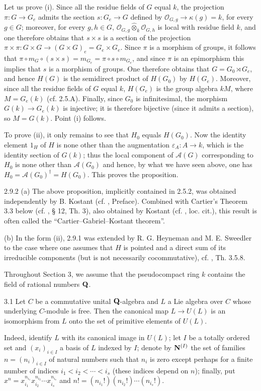 Let us prove (i). Since all the residue fields of $G$ equal $k$, the projection $\pi:G\to G_e$ admits the section $s:G_e\to G$ defined by $\mathcal O_{G,g}\to\kappa(g)=k$, for every $g\in G$; moreover, for every $g,h\in G$, $\mathcal O_{G,g}\widehat\otimes_k\mathcal O_{G,h}$ is local with residue field $k$, and one therefore obtains that $s\times s$ is a section of the projection $\pi\times\pi:G\times G\to(G\times G)_e=G_e\times G_e$. Since $\pi$ is a morphism of groups, it follows that $\pi\circ m_G\circ(s\times s)=m_{G_e}=\pi\circ s\circ m_{G_e}$, and since $\pi$ is an epimorphism this implies that $s$ is a morphism of groups. One therefore obtains that $G=G_0\rtimes G_e$, and hence $H(G)$ is the semidirect product of $H(G_0)$ by $H(G_e)$. Moreover, since all the residue fields of $G$ equal $k$, $H(G_e)$ is the group algebra $kM$, where $M=G_e(k)$ (cf. 2.5.A). Finally, since $G_0$ is infinitesimal, the morphism $G(k)\to G_e(k)$ is injective; it is therefore bijective (since it admits a section), so $M=G(k)$. Point (i) follows.

To prove (ii), it only remains to see that $H_0$ equals $H(G_0)$. Now the identity element $1_H$ of $H$ is none other than the augmentation $\varepsilon_A:A\to k$, which is the identity section of $G(k)$; thus the local component of $\mathscr A(G)$ corresponding to $H_0$ is none other than $\mathscr A(G_0)$ and hence, by what we have seen above, one has $H_0=\mathscr A(G_0)^\dagger=H(G_0)$. This proves the proposition.
\begin{remarks}{2.9.2}\label{VIIB.2.9.2}
(a) The above proposition, implicitly contained in 2.5.2, was obtained independently by B. Kostant (cf. \cite{Sw69}, Preface). Combined with Cartier's Theorem 3.3 below (cf. \cite{Ca62}, § 12, Th. 3), also obtained by Kostant (cf. \cite{Sw69}, loc. cit.), this result is often called the ``Cartier--Gabriel--Kostant theorem''.

(b) In the form (ii), 2.9.1 was extended by R. G. Heyneman and M. E. Sweedler to the case where one assumes that $H$ is pointed and a direct sum of its irreducible components (but is not necessarily cocommutative), cf. \cite{HS69}, Th. 3.5.8.
\end{remarks}

Throughout Section 3, we assume that the pseudocompact ring $k$ contains the field of rational numbers $\mathbf{Q}$.
\begin{lemma}{3.1}\label{VIIB.3.1}
Let $C$ be a commutative unital $\mathbf{Q}$-algebra and $L$ a Lie algebra over $C$ whose underlying $C$-module is free. Then the canonical map $L\to U(L)$ is an isomorphism from $L$ onto the set of primitive elements of $U(L)$.
\end{lemma}
Indeed, identify $L$ with its canonical image in $U(L)$; let $I$ be a totally ordered set and $(x_i)_{i\in I}$ a basis of $L$ indexed by $I$; denote by $\mathbf{N}^{(I)}$ the set of families $n=(n_i)_{i\in I}$ of natural numbers such that $n_i$ is zero except perhaps for a finite number of indices $i_1<i_2<\cdots<i_s$ (these indices depend on $n$); finally, put $x^n=x_{i_1}^{n_{i_1}}x_{i_2}^{n_{i_2}}\cdots x_{i_s}^{n_{i_s}}$ and $n!=(n_{i_1}!)(n_{i_2}!)\cdots(n_{i_s}!)$.

